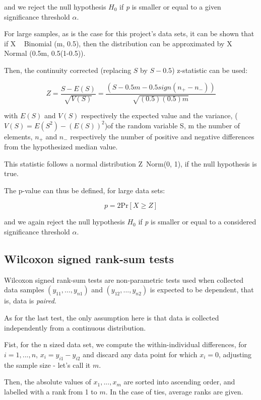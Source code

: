 and we reject the null hypothesis $H_0$ if \textit{p} is smaller or equal to a given significance threshold $\alpha$.

For large samples, as is the case for this project's data sets, it can be shown that if X ~ Binomial (m, 0.5), then the distribution can be approximated by X ~ Normal (0.5m, 0.5(1-0.5)).

Then, the continuity corrected (replacing $S$ by $S-0.5$) z-statistic can be used:

\begin{equation}
Z=\dfrac{S-E(S)}{\sqrt{V(S)}}= \dfrac{(S-0.5m - 0.5 sign(n_+-n_-))}{\sqrt{(0.5)(0.5)m}}
\end{equation}

with $E(S)$ and $V(S)$ respectively the expected value and the variance, ($V(S)=E(S^2)-(E(S))^2$)of the random variable S, m the number of elements, $n_{+}$ and $n_{-}$ respectively the number of positive and negative differences from the hypothesized median value.

This statistic follows a normal distribution Z~Norm(0, 1), if the null hypothesis is true. 

The p-value can thus be defined, for large data sets:

\begin{equation}
p = 2 \text{Pr}\left[X \geq Z\right]
\end{equation}

and we again reject the null hypothesis $H_0$ if \textit{p} is smaller or equal to a considered significance threshold $\alpha$.

\subsection{Wilcoxon signed rank-sum tests}
\label{subsec:subbsectionC}

Wilcoxon signed rank-sum tests are non-parametric tests used when collected data samples $(y_{11},...,y_{n1})$ and $(y_{12},...,y_{n2})$ is expected to be dependent, that is, data is \textit{paired}.

As for the last test, the only assumption here is that data is collected independently from a continuous distribution.

Fist, for the n sized data set, we compute the within-individual differences, for $i=1,...,n$, $x_i = y_{i1} - y_{i2}$ and discard any data point for which $x_i=0$, adjusting the sample size - let's call it $m$.

Then, the absolute values of $x_1,...,x_m$ are sorted into ascending order, and labelled with a rank from 1 to $m$. In the case of ties, average ranks are given.

